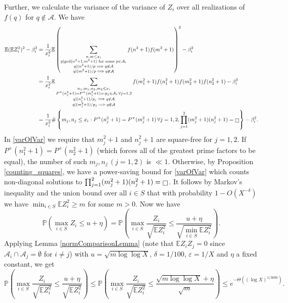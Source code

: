 \documentclass[11pts]{amsart}
\numberwithin{equation}{section}
\let\oldsquare\square
\renewcommand{\square}[1][-1pt]{%
 {\raisebox{#1}{$\oldsquare$}}%
}
\begin{document}
Further, we calculate the variance of the variance of $Z_i$ over all realizations of $f(q)$ for $q\not\in\mathcal A$. We have 
\begin{align}
    \mathbb E(\mathbb EZ_i^2)^2 - \beta_i^2 & =  \frac{1}{x_i^2} \mathbb E\left(\sum_{\substack{n, m\leq x_i \\ p\mid \gcd(n^2 + 1, m^2 + 1) \text{ for some } p\in \mathcal A_i \\ q\mid (n^2 + 1)/p\implies q\not\in\mathcal A \\ q\mid (m^2 + 1)/p\implies q\not\in\mathcal A}} f(n^2+1)f(m^2 + 1)\right)^2 - \beta_i^2\\ & = \frac{1}{x_i^2} \mathbb E \sum_{\substack{n_1, m_1, n_2, m_2\leq x_i \\ P^+(n_j^2 + 1) = P^+(m_j^2 + 1) =: p_j\in\mathcal A_i \,\forall j=1, 2\\ q\mid (n_j^2 + 1)/p_j \implies q\not\in\mathcal A \\ q\mid (m_j^2 + 1)/p_j \implies q\not\in\mathcal A}} f(m_1^2 + 1)f(n_1^2 + 1)f(m_2^2 + 1)f(n_2^2 + 1)  - \beta_i^2 \\ & = \frac{1}{x_i^2} \#\left\{m_j, n_j\leq x_i : P^+(n_j^2 + 1) = P^+(m_j^2 + 1) \,\forall j=1, 2, \prod_{j=1}^2 (m_j^2+1)(n_j^2+1) = \square\right\}  - \beta_i^2. \label{varOfVar}
\end{align}
In \eqref{varOfVar} we require that $m_j^2 + 1$ and $n_j^2 + 1$ are square-free for $j=1, 2$. If $P^+(n_1^2+1) = P^+(n_2^2+1)$ (which forces all of the greatest prime factors to be equal), the number of such $m_j, n_j \, (j=1, 2)$ is $\ll 1$. Otherwise, by Proposition \ref{counting_squares}, we have a power-saving bound for \eqref{varOfVar} which counts non-diagonal solutions to $\prod_{j=1}^2 (m_j^2+1)(n_j^2 + 1) = \square$. It follows by Markov's inequality and the union bound over all $i\in S$ that with probability $1-O(X^{-\delta})$ we have $\min_{i\in S} \mathbb EZ_i^2 \geq m$ for some $m>0$. Now we have 
\begin{equation}
    \mathbb P\left(\max_{i\in S} Z_i\leq u + \eta \right) = \mathbb P\left(\max_{i\in S} \frac{Z_i}{\sqrt{\mathbb EZ_i^2}}\leq \frac{u + \eta}{\sqrt{\min_{i\in S}\mathbb EZ_i^2}} \right).
\end{equation}
Applying Lemma \ref{normComparisonLemma} (note that $\mathbb EZ_iZ_j = 0$ since $\mathcal A_i\cap \mathcal A_j = \emptyset$ for $i\neq j$) with $u=\sqrt{m\log\log X}$, $\delta = 1/100$, $\varepsilon = 1/X$ and $\eta$ a fixed constant, we get 
\begin{equation}
    \mathbb P\left(\max_{i\in S} \frac{Z_i}{\sqrt{\mathbb EZ_i^2}}\leq \frac{u + \eta}{\sqrt{\mathbb EZ_i^2}} \right)\leq \mathbb P\left(\max_{i\in S} \frac{Z_i}{\sqrt{\mathbb EZ_i^2}}\leq \frac{\sqrt{m\log\log X} + \eta}{\sqrt{m}} \right)\leq e^{-\Theta((\log X)^{1/3000})}. \label{finalEq}
\end{equation}
\end{document}
